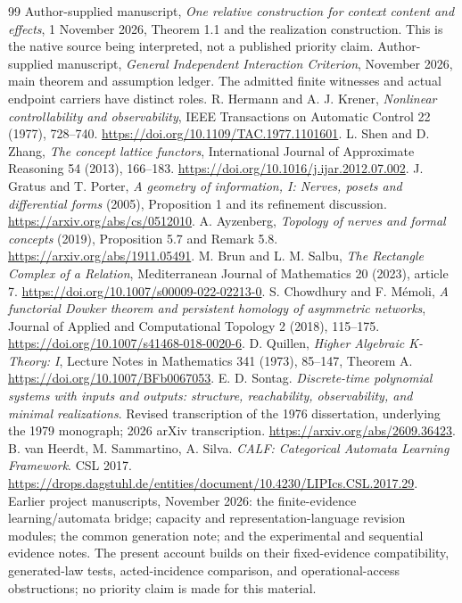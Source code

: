\documentclass[11pt]{article}
\theoremstyle{definition}\newtheorem{definition}[theorem]{Definition}
\theoremstyle{remark}\newtheorem{remark}[theorem]{Remark}
\begin{document}
\begin{thebibliography}{99}
Author-supplied manuscript, \emph{One relative construction for context
content and effects}, 1 November 2026, Theorem 1.1 and the realization
construction. This is the native source being interpreted, not a published
priority claim.
Author-supplied manuscript, \emph{General Independent Interaction
Criterion}, November 2026, main theorem and assumption ledger.
The admitted finite witnesses and actual endpoint carriers have distinct roles.
R. Hermann and A. J. Krener,
\emph{Nonlinear controllability and observability}, IEEE Transactions on
Automatic Control 22 (1977), 728--740.
\url{https://doi.org/10.1109/TAC.1977.1101601}.
L. Shen and D. Zhang, \emph{The concept lattice functors},
International Journal of Approximate Reasoning 54 (2013), 166--183.
\url{https://doi.org/10.1016/j.ijar.2012.07.002}.
J. Gratus and T. Porter, \emph{A geometry of information, I:
Nerves, posets and differential forms} (2005), Proposition 1 and its
refinement discussion. \url{https://arxiv.org/abs/cs/0512010}.
A. Ayzenberg, \emph{Topology of nerves and formal concepts} (2019),
Proposition 5.7 and Remark 5.8. \url{https://arxiv.org/abs/1911.05491}.
M. Brun and L. M. Salbu, \emph{The Rectangle Complex of a Relation},
Mediterranean Journal of Mathematics 20 (2023), article 7.
\url{https://doi.org/10.1007/s00009-022-02213-0}.
S. Chowdhury and F. M\'emoli, \emph{A functorial Dowker theorem and
persistent homology of asymmetric networks}, Journal of Applied and
Computational Topology 2 (2018), 115--175.
\url{https://doi.org/10.1007/s41468-018-0020-6}.
D. Quillen, \emph{Higher Algebraic K-Theory: I}, Lecture Notes in
Mathematics 341 (1973), 85--147, Theorem A.
\url{https://doi.org/10.1007/BFb0067053}.
E. D. Sontag. \emph{Discrete-time polynomial systems with inputs and outputs:
structure, reachability, observability, and minimal realizations}.
Revised transcription of the 1976 dissertation, underlying the 1979
monograph; 2026 arXiv transcription. \url{https://arxiv.org/abs/2609.36423}.
B. van Heerdt, M. Sammartino, A. Silva.
\emph{CALF: Categorical Automata Learning Framework}. CSL 2017.
\url{https://drops.dagstuhl.de/entities/document/10.4230/LIPIcs.CSL.2017.29}.
Earlier project manuscripts, November 2026: the finite-evidence
learning/automata bridge; capacity and representation-language revision
modules; the common generation note; and the experimental and sequential
evidence notes. The present account builds on their fixed-evidence
compatibility, generated-law tests, acted-incidence comparison, and
operational-access obstructions; no priority claim is made for this material.

\end{thebibliography}
\end{document}
